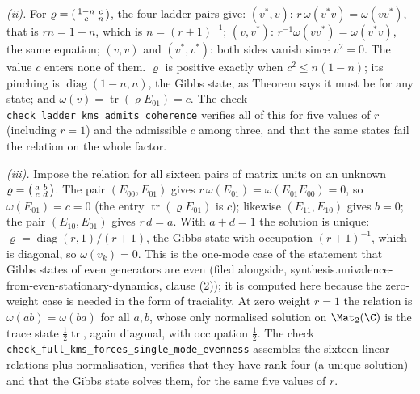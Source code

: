 \emph{(ii).} For $\varrho = \begin{psmallmatrix} 1-n & c \\ c & n\end{psmallmatrix}$, the four ladder pairs give: $(v^{*}, v)$: $r\,\omega(v^{*}v) = \omega(vv^{*})$, that is $rn = 1 - n$, which is $n = (r+1)^{-1}$; $(v, v^{*})$: $r^{-1}\omega(vv^{*}) = \omega(v^{*}v)$, the same equation; $(v, v)$ and $(v^{*}, v^{*})$: both sides vanish since $v^2 = 0$. The value $c$ enters none of them. $\varrho$ is positive exactly when $c^2 \leq n(1-n)$; its pinching is $\operatorname{diag}(1-n, n)$, the Gibbs state, as Theorem  says it must be for any state; and $\omega(v) = \operatorname{tr}(\varrho E_{01}) = c$. The check \texttt{check\_ladder\_kms\_admits\_coherence} verifies all of this for five values of $r$ (including $r = 1$) and the admissible $c$ among three, and that the same states fail the relation on the whole factor.

\emph{(iii).} Impose the relation for all sixteen pairs of matrix units on an unknown $\varrho = \begin{psmallmatrix} a & b \\ c & d \end{psmallmatrix}$. The pair $(E_{00}, E_{01})$ gives $r\,\omega(E_{01}) = \omega(E_{01}E_{00}) = 0$, so $\omega(E_{01}) = c = 0$ (the entry $\operatorname{tr}(\varrho E_{01})$ is $c$); likewise $(E_{11}, E_{10})$ gives $b = 0$; the pair $(E_{10}, E_{01})$ gives $r\,d = a$. With $a + d = 1$ the solution is unique: $\varrho = \operatorname{diag}(r, 1)/(r + 1)$, the Gibbs state with occupation $(r+1)^{-1}$, which is diagonal, so $\omega(v_k) = 0$. This is the one-mode case of the statement that Gibbs states of even generators are even (filed alongside, synthesis.univalence-from-even-stationary-dynamics, clause (2)); it is computed here because the zero-weight case is needed in the form of traciality. At zero weight $r = 1$ the relation is $\omega(ab) = \omega(ba)$ for all $a, b$, whose only normalised solution on $\Mat_2(\C)$ is the trace state $\tfrac12\operatorname{tr}$, again diagonal, with occupation $\tfrac12$. The check \texttt{check\_full\_kms\_forces\_single\_mode\_evenness} assembles the sixteen linear relations plus normalisation, verifies that they have rank four (a unique solution) and that the Gibbs state solves them, for the same five values of $r$.

